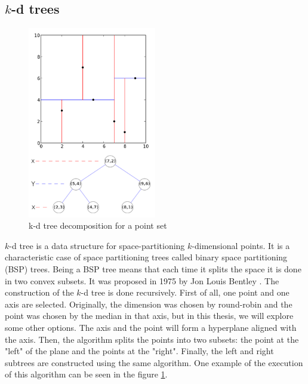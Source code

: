 \subsection{$k$-d trees}
\begin{figure}
    \centering
    \includegraphics[width=0.5\textwidth]{setup/img/kdtree.png}
    \caption{k-d tree decomposition for a point set \cite{wiki:kdtree}}
    \label{fig:kdtree}
\end{figure}
$k$-d tree is a data structure for space-partitioning $k$-dimensional points. It is a characteristic case of space partitioning trees called binary space partitioning (BSP) trees. Being a BSP tree means that each time it splits the space it is done in two convex subsets. It was proposed in 1975 by Jon Louis Bentley \cite{Bentley}. The construction of the $k$-d tree is done recursively. First of all, one point and one axis are selected. Originally, the dimension was chosen by round-robin and the point was chosen by the median in that axis, but in this thesis, we will explore some other options. The axis and the point will form a hyperplane aligned with the axis. Then, the algorithm splits the points into two subsets: the point at the "left" of the plane and the points at the "right". Finally, the left and right subtrees are constructed using the same algorithm. One example of the execution of this algorithm can be seen in the figure \ref{fig:kdtree}.

